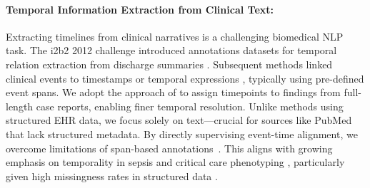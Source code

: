 \paragraph{Temporal Information Extraction from Clinical Text:}
Extracting timelines from clinical narratives is a challenging biomedical NLP task. 
The i2b2 2012 challenge introduced annotations datasets for temporal relation extraction from discharge summaries \citep{uzuner20112010}. 
Subsequent methods linked clinical events to timestamps or temporal expressions \citep{leeuwenberg2020towards, frattallone2024using}, typically using pre-defined event spans. 
We adopt the approach of \citet{noroozizadeh2025reconstructing} to assign timepoints to findings from full-length case reports, enabling finer temporal resolution. 
Unlike methods using structured EHR data, we focus solely on text—crucial for sources like PubMed that lack structured metadata. 
By directly supervising event-time alignment, we overcome limitations of span-based annotations~\citep{rosenbloom2011data}. 
This aligns with growing emphasis on temporality in sepsis and critical care phenotyping \citep{johnson2018comparative, kamran2024evaluation}, particularly given high missingness rates in structured data \citep{johnson2023mimic,seinen2025using}.

